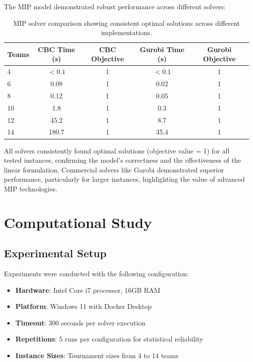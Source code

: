 \documentclass[11pt]{article}
\begin{document}
The MIP model demonstrated robust performance across different solvers:

\begin{table}[H]
\centering
\small
\begin{tabular}{@{}lcccc@{}}
\toprule
\textbf{Teams} & \textbf{CBC Time (s)} & \textbf{CBC Objective} & \textbf{Gurobi Time (s)} & \textbf{Gurobi Objective} \\
\midrule
4  & $<0.1$ & 1 & $<0.1$ & 1 \\
6  & 0.08   & 1 & 0.02   & 1 \\
8  & 0.12   & 1 & 0.05   & 1 \\
10 & 1.8    & 1 & 0.3    & 1 \\
12 & 45.2   & 1 & 8.7    & 1 \\
14 & 180.7  & 1 & 35.4   & 1 \\
\bottomrule
\end{tabular}
\caption{MIP solver comparison showing consistent optimal solutions across different implementations.}
\label{tab:mip_validation}
\end{table}

All solvers consistently found optimal solutions (objective value = 1) for all tested instances, confirming the model's correctness and the effectiveness of the linear formulation. Commercial solvers like Gurobi demonstrated superior performance, particularly for larger instances, highlighting the value of advanced MIP technologies.

\section{Computational Study}

\subsection{Experimental Setup}

Experiments were conducted with the following configuration:
\begin{itemize}
    \item \textbf{Hardware}: Intel Core i7 processor, 16GB RAM
    \item \textbf{Platform}: Windows 11 with Docker Desktop
    \item \textbf{Timeout}: 300 seconds per solver execution
    \item \textbf{Repetitions}: 5 runs per configuration for statistical reliability
    \item \textbf{Instance Sizes}: Tournament sizes from 4 to 14 teams
\end{itemize}
\end{document}
